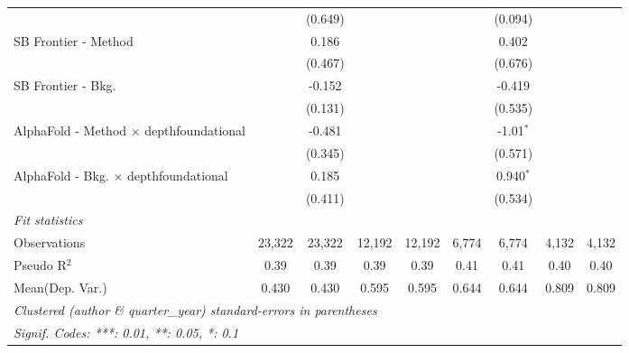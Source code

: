\begin{tabular}{lcccccccc}
                                                  &               & (0.649)       &        &        &               & (0.094)       &       &   \\   
   SB Frontier - Method                           &               & 0.186         &        &        &               & 0.402         &       &   \\   
                                                  &               & (0.467)       &        &        &               & (0.676)       &       &   \\   
   SB Frontier - Bkg.                             &               & -0.152        &        &        &               & -0.419        &       &   \\   
                                                  &               & (0.131)       &        &        &               & (0.535)       &       &   \\   
   AlphaFold - Method $\times$ depthfoundational  &               & -0.481        &        &        &               & -1.01$^{*}$   &       &   \\   
                                                  &               & (0.345)       &        &        &               & (0.571)       &       &   \\   
   AlphaFold - Bkg. $\times$ depthfoundational    &               & 0.185         &        &        &               & 0.940$^{*}$   &       &   \\   
                                                  &               & (0.411)       &        &        &               & (0.534)       &       &   \\   
   \midrule
   \emph{Fit statistics}\\
   Observations                                   & 23,322        & 23,322        & 12,192 & 12,192 & 6,774         & 6,774         & 4,132 & 4,132\\  
   Pseudo R$^2$                                   & 0.39          & 0.39          & 0.39   & 0.39   & 0.41          & 0.41          & 0.40  & 0.40\\  
Mean(Dep. Var.) & 0.430 & 0.430 & 0.595 & 0.595 & 0.644 & 0.644 & 0.809 & 0.809 \\
   \midrule \midrule
   \multicolumn{9}{l}{\emph{Clustered (author \& quarter\_year) standard-errors in parentheses}}\\
   \multicolumn{9}{l}{\emph{Signif. Codes: ***: 0.01, **: 0.05, *: 0.1}}\\
\end{tabular}
\par\endgroup
